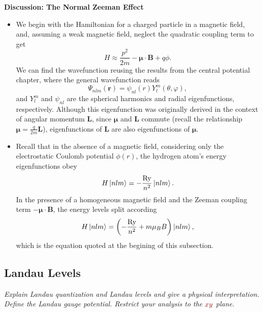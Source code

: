 \documentclass[11pt, a4paper]{article}
\newcommand{\qmath}[1]{\textcolor{Maroon}{#1}}  %
\renewcommand{\vec}[1]{\bm{#1}}  %
\renewcommand{\r}{\vec{r}}  %
\renewcommand{\L}{\vec{L}}  %
\newcommand{\B}{\vec{B}}  %
\newcommand{\m}{\vec{\mu}}  %
\newcommand{\p}{\psi}  %
\renewcommand{\P}{\Psi}  %
\begin{document}
\textbf{Discussion: The Normal Zeeman Effect}
\begin{itemize}

    \item We begin with the Hamiltonian for a charged particle in a magnetic field, and, assuming a weak magnetic field, neglect the quadratic coupling term to get
	\begin{equation*}
		H \approx \frac{p^{2}}{2m} - \m \cdot \B + q \phi.
	\end{equation*}
	We can find the wavefunction reusing the results from the central potential chapter, where the general wavefunction reads
	\begin{equation*}
		\P_{nlm}(\r) = \p_{nl}(r) Y_{l}^{m}(\theta, \varphi),
	\end{equation*}
	and $ Y_{l}^{m} $ and $ \p_{nl} $ are the spherical harmonics and radial eigenfunctions, respectively. Although this eigenfunction was originally derived in the context of angular momentum $ \vec{L} $, since $ \m $ and $ \L $ commute (recall the relationship $ \m = \frac{q}{2m}\L $), eigenfunctions of $ \L $ are also eigenfunctions of $ \m $. 
	
	\item Recall that in the absence of a magnetic field, considering only the electrostatic Coulomb potential $ \phi(r) $, the hydrogen atom's energy eigenfunctions obey
	\begin{equation*}
		H \ket{nlm} = - \frac{\si{Ry}}{n^{2}}\ket{nlm}.
	\end{equation*}
	In the presence of a homogeneous magnetic field and the Zeeman coupling term $ - \m \cdot \B $, the energy levels split according
	\begin{equation*}
		H \ket{nlm} = \left(- \frac{\si{Ry}}{n^{2}} + m \mu_{B}B\right)\ket{nlm},
	\end{equation*}
    which is the equation quoted at the begining of this subsection.
	
\end{itemize}


\subsection{Landau Levels}
\textit{Explain Landau quantization and Landau levels and give a physical interpretation. Define the Landau gauge potential. Restrict your analysis to the $ \qmath{xy} $ plane.}
\end{document}
